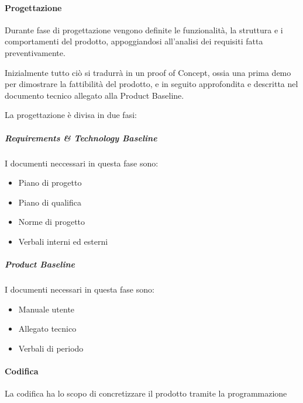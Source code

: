 \documentclass[12pt]{article}
\begin{document}
\paragraph{Progettazione}
Durante fase di progettazione vengono definite le funzionalità, la struttura e i comportamenti del prodotto, appoggiandosi all'analisi dei requisiti fatta preventivamente.

Inizialmente tutto ciò si tradurrà in un proof of Concept, ossia una prima demo per dimostrare la fattibilità del prodotto, e in seguito approfondita e descritta nel documento tecnico allegato alla Product Baseline.

La progettazione è divisa in due fasi:

\subparagraph{Requirements \& Technology Baseline}
I documenti neccessari in questa fase sono:
\begin{itemize}
    \item Piano di progetto
    \item Piano di qualifica
    \item Norme di progetto
    \item Verbali interni ed esterni
\end{itemize}

\subparagraph{Product Baseline}
I documenti necessari in questa fase sono:
\begin{itemize}
    \item Manuale utente
    \item Allegato tecnico
    \item Verbali di periodo
\end{itemize}

\paragraph{Codifica}
La codifica ha lo scopo di concretizzare il prodotto tramite la programmazione
\end{document}

